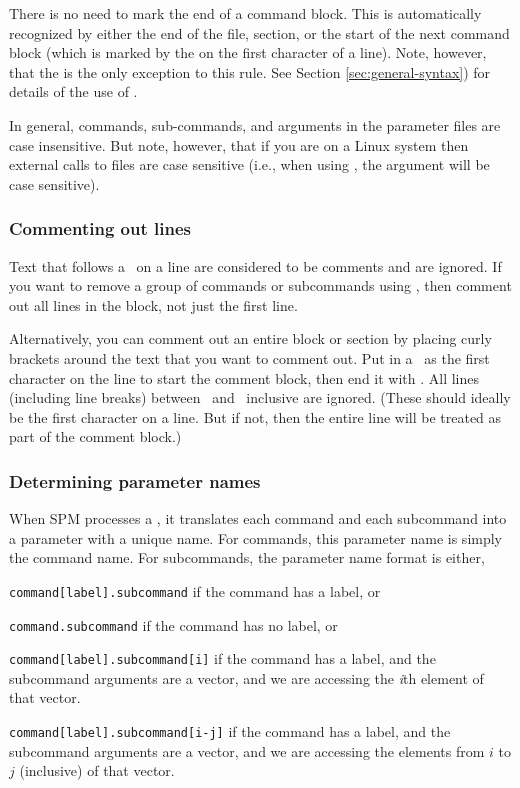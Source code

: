 There is no need to mark the end of a command block. This is automatically recognized by either the end of the file, section, or the start of the next command block (which is marked by the \command{} on the first character of a line). Note, however, that the  is the only exception to this rule. See Section \ref{sec:general-syntax}) for details of the use of . 

In general, commands, sub-commands, and arguments in the parameter files are case insensitive. But note, however, that if you are on a Linux system then external calls to files are case sensitive (i.e., when using  , the argument  will be case sensitive). 

\subsubsection{Commenting out lines}

Text that follows a \commentline\ on a line are considered to be comments and are ignored. If you want to remove a group of commands or subcommands using \commentline, then comment out all lines in the block, not just the first line. 

Alternatively, you can comment out an entire block or section by placing curly brackets around the text that you want to comment out. Put in a \commentstart\ as the first character on the line to start the comment block, then end it with \commentend. All lines (including line breaks) between \commentstart\ and \commentend\ inclusive are ignored. (These should ideally be the first character on a line. But if not, then the entire line will be treated as part of the comment block.)

\subsubsection{Determining parameter names\label{sec:parameter-names}}

When SPM processes a \config, it translates each command and each subcommand into a parameter with a unique name. For commands, this parameter name is simply the command name. For subcommands, the parameter name format is either, 

\begin{description}
\item \texttt{command[label].subcommand} if the command has a label, or
\item \texttt{command.subcommand} if the command has no label, or
\item \texttt{command[label].subcommand[i]} if the command has a label, and the subcommand arguments are a vector, and we are accessing the  \emph{i}th element of that vector. 
\item \texttt{command[label].subcommand[i-j]} if the command has a label, and the subcommand arguments are a vector, and we are accessing the elements from $i$ to $j$ (inclusive) of that vector. 
\end{description} 

